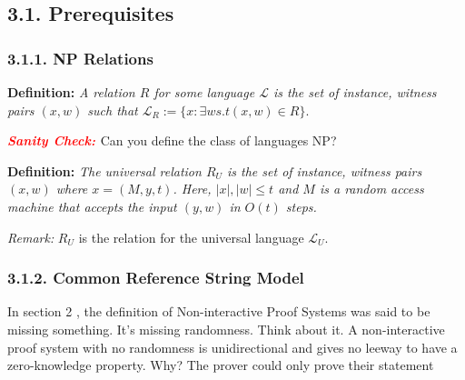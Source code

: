 \documentclass{article}
\newcommand{\scheck}{\textbf{\textit{\textcolor{red}{Sanity Check: }}}}
\begin{document}
\subsection*{3.1. Prerequisites}

\subsubsection*{3.1.1. NP Relations}
\textbf{Definition:} \textit{A relation $R$ for some language $\mathcal{L}$ is the set of instance, witness pairs $(x, w)$ such that $\mathcal{L}_{R} := \{x : \exists w s.t (x, w) \in R\}$}.

\scheck Can you define the class of languages \textsc{NP}?

\textbf{Definition:} \textit{The universal relation $R_U$ is the set of instance, witness pairs $(x, w)$ where $x = (M, y, t)$. Here, $|x|, |w| \leq t$ and $M$ is a random access machine that accepts the input $(y, w)$ in $O(t)$ steps.}

\textit{Remark: } $R_U$ is the relation for the universal language $\mathcal{L}_U$.
\subsubsection*{3.1.2. Common Reference String Model}
In section 2 \cite{QSP}, the definition of Non-interactive Proof Systems was said to be missing something. It's missing randomness. Think about it. A non-interactive proof system with no randomness is unidirectional and gives no leeway to have a zero-knowledge property. Why? The prover could only prove their statement
\end{document}

